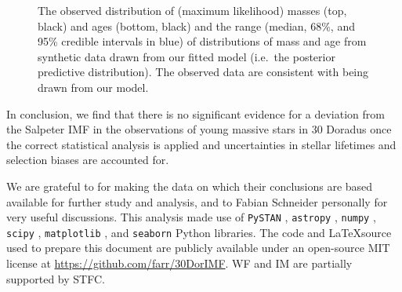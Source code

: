 \documentclass[apjl]{emulateapj}
\newcommand{\MSun}{M_\odot}
\begin{document}
\begin{figure}
    		\caption{The observed distribution of (maximum likelihood) masses (top, black) and ages (bottom, black) and the range (median, 68\%, and 95\% credible intervals in blue) of distributions of mass and age from synthetic data drawn from our fitted model (i.e.\ the posterior predictive distribution).  The observed data are consistent with being drawn from our model.  %
		}\label{fig:PPC}
\end{figure}


In conclusion, we find that there is no significant evidence for a deviation from the Salpeter IMF \citep{Salpeter:1955} in the observations of young massive stars in 30 Doradus once the correct statistical analysis is applied and uncertainties in stellar lifetimes and selection biases are accounted for.

\acknowledgments

We are grateful to \citet{Schneider:2018} for making the data on which their conclusions are
based available for further study and analysis, and to Fabian Schneider personally for very useful discussions.  This analysis made use of \texttt{PySTAN} \citep{PySTAN}, \texttt{astropy} \citep{astropy}, \texttt{numpy} \citep{numpy}, \texttt{scipy} \citep{scipy}, \texttt{matplotlib} \citep{matplotlib}, and \texttt{seaborn} \citep{seaborn} Python libraries.  The code and \LaTeX source used to prepare this document are publicly available under an open-source MIT license at \url{https://github.com/farr/30DorIMF}.  WF and IM are partially supported by STFC.



\end{document}
